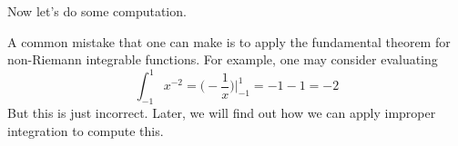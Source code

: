   \begin{corollary}
    \label{thm:integration-of-trigonometric-functions}
    
  \end{corollary}

  Now let's do some computation. 

  \begin{example}
    \label{ex:cannot-apply-fundamental-theorem-for}
    A common mistake that one can make is to apply the fundamental theorem for non-Riemann integrable functions. For example, one may consider evaluating 
    \begin{equation}
      \int_{-1}^1 x^{-2} = \bigg(-\frac{1}{x}\bigg) \bigg|_{-1}^1 = -1 - 1 = -2
    \end{equation}
    But this is just incorrect. Later, we will find out how we can apply improper integration to compute this. 
  \end{example}

